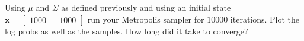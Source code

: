 \begin{problem}
Using $\mu$ and $\Sigma$ as defined previously and using an initial state $\mathbf{x} = \left[ \begin{array}{cc} 1000 & -1000 \end{array} \right]$ run your Metropolis sampler for $10000$ iterations. Plot the log probs as well as the samples. How long did it take to converge?
\end{problem}